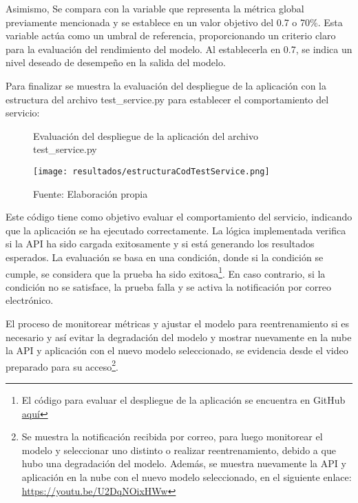 Asimismo, Se compara con la variable que representa la métrica global previamente mencionada y se establece en un valor objetivo del 0.7 o 70\%. Esta variable actúa como un umbral de referencia, proporcionando un criterio claro para la evaluación del rendimiento del modelo. Al establecerla en 0.7, se indica un nivel deseado de desempeño en la salida del modelo. \newline

Para finalizar se muestra la evaluación del despliegue de la aplicación con la estructura del archivo test\_service.py para establecer el comportamiento del servicio:

\begin{figure}[h]
	\centering
	\caption{Evaluación del despliegue de la aplicación del archivo test\_service.py}
	\texttt{[image: resultados/estructuraCodTestService.png]}
	\caption*{\footnotesize Fuente: Elaboración propia}
	\label{fig:figuraEstructuraCodTestService}
\end{figure}

\newpage

Este código tiene como objetivo evaluar el comportamiento del servicio, indicando que la aplicación se ha ejecutado correctamente. La lógica implementada verifica si la API ha sido cargada exitosamente y si está generando los resultados esperados. La evaluación se basa en una condición, donde si la condición se cumple, se considera que la prueba ha sido exitosa\footnote{El código para evaluar el despliegue de la aplicación se encuentra en GitHub \href{https://github.com/juferoto/mlops_project/tree/master/application/tests}{aquí}}. En caso contrario, si la condición no se satisface, la prueba falla y se activa la notificación por correo electrónico. \newline

El proceso de monitorear métricas y ajustar el modelo para reentrenamiento si es necesario y así evitar la degradación del modelo y mostrar nuevamente en la nube la API y aplicación con el nuevo modelo seleccionado, se evidencia desde el video preparado para su acceso\footnote{Se muestra la notificación recibida por correo, para luego monitorear el modelo y seleccionar uno distinto o realizar reentrenamiento, debido a que hubo una degradación del modelo. Además, se muestra nuevamente la API y aplicación en la nube con el nuevo modelo seleccionado, en el siguiente enlace: \href{https://youtu.be/U2DqNOixHWw}{https://youtu.be/U2DqNOixHWw}}.

